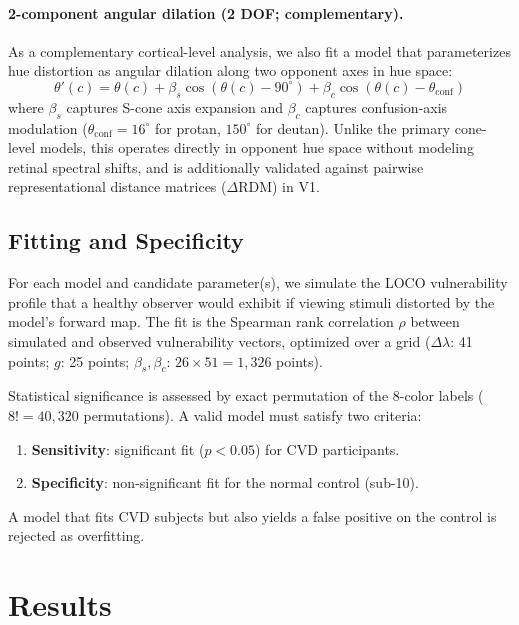 \documentclass{article}
\begin{document}
\paragraph{2-component angular dilation (2 DOF; complementary).}
As a complementary cortical-level analysis, we also fit a model that parameterizes hue distortion as angular dilation along two opponent axes in hue space:
\begin{equation}
\theta'(c) = \theta(c) + \beta_s \cos(\theta(c) {-} 90^\circ) + \beta_c \cos(\theta(c) {-} \theta_{\text{conf}})
\label{eq:2comp}
\end{equation}
where $\beta_s$ captures S-cone axis expansion and $\beta_c$ captures confusion-axis modulation ($\theta_{\text{conf}} = 16^\circ$ for protan, $150^\circ$ for deutan).
Unlike the primary cone-level models, this operates directly in opponent hue space without modeling retinal spectral shifts, and is additionally validated against pairwise representational distance matrices ($\Delta$RDM) in V1.

\subsection{Fitting and Specificity}

For each model and candidate parameter(s), we simulate the LOCO vulnerability profile that a healthy observer would exhibit if viewing stimuli distorted by the model's forward map.
The fit is the Spearman rank correlation $\rho$ between simulated and observed vulnerability vectors, optimized over a grid ($\Delta\lambda$: 41 points; $g$: 25 points; $\beta_s, \beta_c$: $26 \times 51 = 1{,}326$ points).

Statistical significance is assessed by exact permutation of the 8-color labels ($8! = 40{,}320$ permutations).
A valid model must satisfy two criteria:
\begin{enumerate}
    \item \textbf{Sensitivity}: significant fit ($p < 0.05$) for CVD participants.
    \item \textbf{Specificity}: non-significant fit for the normal control (sub-10).
\end{enumerate}
A model that fits CVD subjects but also yields a false positive on the control is rejected as overfitting.

\section{Results}
\label{sec:results}
\end{document}
